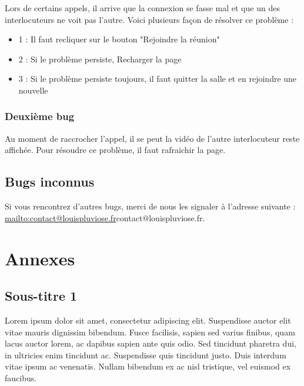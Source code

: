 \documentclass[12pt, a4paper, oneside]{Thesis}
\begin{document}
Lors de certains appels, il arrive que la connexion se fasse mal et que un des interlocuteurs ne voit pas l'autre. Voici plusieurs façon de résolver ce problème :\\

\begin{itemize}
  \item 1 : Il faut recliquer sur le bouton "Rejoindre la réunion"
  \item 2 : Si le problème persiste, Recharger la page
  \item 3 : Si le problème persiste toujours, il faut quitter la salle et en rejoindre une nouvelle
\end{itemize}

\subsubsection{Deuxième bug}

Au moment de raccrocher l'appel, il se peut la vidéo de l'autre interlocuteur reste affichée. Pour résoudre ce problème, il faut rafraichir la page.\\

\subsection{Bugs inconnus}

Si vous rencontrez d'autres bugs, merci de nous les signaler à l'adresse suivante : \url{mailto:contact@louispluviose.fr}{contact@louispluviose.fr}.

\newpage

\section{Annexes}

\subsection{Sous-titre 1}


Lorem ipsum dolor sit amet, consectetur adipiscing elit. Suspendisse auctor elit vitae mauris dignissim bibendum. Fusce facilisis, sapien sed varius finibus, quam lacus auctor lorem, ac dapibus sapien ante quis odio. Sed tincidunt pharetra dui, in ultricies enim tincidunt ac. Suspendisse quis tincidunt justo. Duis interdum vitae ipsum ac venenatis. Nullam bibendum ex ac nisl tristique, vel euismod ex faucibus.\\
\end{document}

